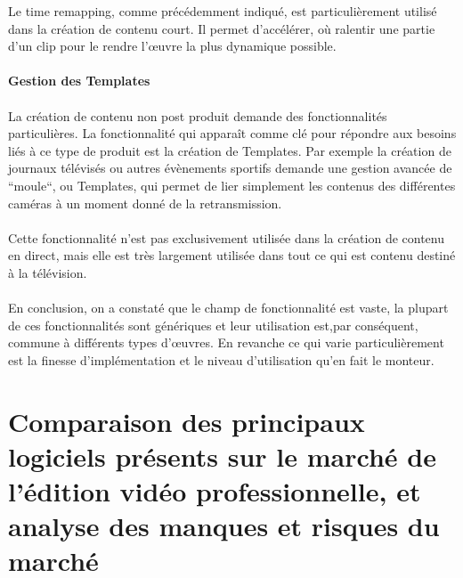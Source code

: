 Le time remapping, comme précédemment indiqué, est particulièrement
utilisé dans la création de contenu court. Il permet d'accélérer,
où ralentir une partie d'un clip pour le rendre l'œuvre la plus
dynamique possible.

\paragraph{Gestion des Templates}

\paragraph{ }

La création de contenu non post produit demande des fonctionnalités
particulières. La fonctionnalité qui apparaît comme clé pour répondre
aux besoins liés à ce type de produit est la création de Templates. Par
exemple la création de journaux télévisés ou autres évènements
sportifs demande une gestion avancée de ``moule``, ou Templates, qui
permet de lier simplement les contenus des différentes caméras à un
moment donné de la retransmission.

\paragraph{ }

Cette fonctionnalité n'est pas exclusivement utilisée dans la création
de contenu en direct, mais elle est très largement utilisée dans tout
ce qui est contenu destiné à la télévision.

\paragraph{} \paragraph{}

En conclusion, on a constaté que le champ de fonctionnalité est vaste,
la plupart de ces fonctionnalités sont génériques et leur utilisation
est,par conséquent, commune à différents types d'œuvres. En revanche
ce qui varie particulièrement  est la finesse d'implémentation et le
niveau d'utilisation qu'en fait le monteur.

\newpage \section{Comparaison des principaux logiciels présents sur le
marché de l'édition vidéo professionnelle, et analyse des manques et
risques du marché}


